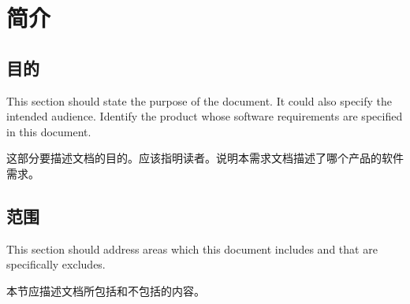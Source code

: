 \chapter{简介}
\section{目的}
This section should state the purpose of the document. It could also specify the intended audience. Identify the product whose software requirements are specified in this document.

这部分要描述文档的目的。应该指明读者。说明本需求文档描述了哪个产品的软件需求。

\section{范围}
This section should address areas which this document includes and that are specifically excludes. 

本节应描述文档所包括和不包括的内容。
